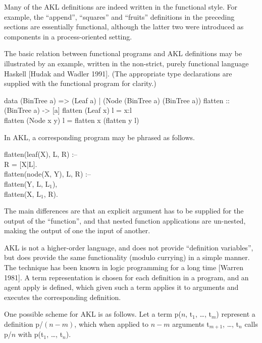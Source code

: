 Many of the AKL definitions are indeed written in the functional
style.  For example, the ``{\prog append}'', ``{\prog squares}'' and
``{\prog fruits}'' definitions in the preceding sections are
essentially functional, although the latter two were introduced as
components in a process-oriented setting.

The basic relation between functional programs and AKL definitions may
be illustrated by an example, written in the non-strict, purely
functional language Haskell [Hudak and Wadler 1991].  (The appropriate
type declarations are supplied with the functional program for
clarity.)
%
\begin{program}
data (BinTree a) => (Leaf a) | (Node (BinTree a) (BinTree a)) \nl
flatten :: (BinTree a) -> [a] \nl
flatten (Leaf x) l = x:l \\
flatten (Node x y) l = flatten x (flatten y l)
\end{program}%
%
In AKL, a corresponding program may be phrased as follows.
%
\begin{program}
flatten(leaf(X), L, R) :-- \\
\>\cond\>	R = [X|L].  \\
flatten(node(X, Y), L, R) :-- \\
\>\cond\>	flatten(Y, L, L$_1$), \\
\>\>	flatten(X, L$_1$, R).
\end{program}%
%
The main differences are that an explicit argument has to be supplied
for the output of the ``function'', and that nested function
applications are un-nested, making the output of one the input of
another.

AKL is not a higher-order language, and does not provide ``definition
variables'', but does provide the same functionality (modulo currying)
in a simple manner.  The technique has been known in logic programming
for a long time [Warren 1981].  A term representation is chosen for
each definition in a program, and an agent apply is defined, which
given such a term applies it to arguments and executes the
corresponding definition.

One possible scheme for AKL is as follows.  Let a term {\prog p($n$,
t$_1$, \dots, t$_m$)} represent a definition {\prog p/$(n-m)$}, which
when applied to $n-m$ arguments {\prog t$_{m+1}$, \dots, t$_n$} calls
{\prog p/$n$} with {\prog p(t$_1$,
\dots, t$_n$)}.

